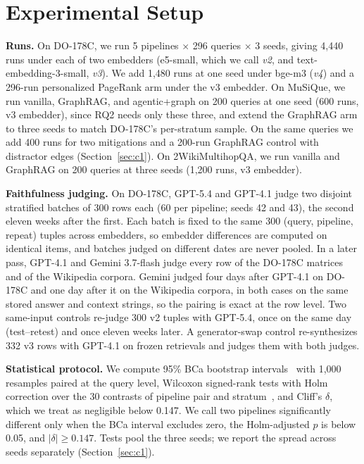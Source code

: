 \section{Experimental Setup}
\label{sec:experiments}

\noindent\textbf{Runs.} On DO-178C, we run 5 pipelines $\times$ 296 queries
$\times$ 3 seeds, giving 4{,}440 runs under each of two embedders
(e5-small, which we call \emph{v2}, and text-embedding-3-small,
\emph{v3}). We add 1{,}480 runs at one seed under bge-m3 (\emph{v4})
and a 296-run personalized PageRank arm under the v3 embedder. On
MuSiQue, we run vanilla, GraphRAG, and agentic+graph on 200 queries at
one seed (600 runs, v3 embedder), since RQ2 needs only these three, and
extend the GraphRAG arm to three seeds to match DO-178C's per-stratum
sample. On the same queries we add 400 runs for two mitigations and a
200-run GraphRAG control with distractor edges (Section~\ref{sec:c1}).
On 2WikiMultihopQA, we run vanilla and GraphRAG on 200 queries at three
seeds (1{,}200 runs, v3 embedder).

\noindent\textbf{Faithfulness judging.} On DO-178C, GPT-5.4 and GPT-4.1 judge
two disjoint stratified batches of 300 rows each (60 per pipeline;
seeds 42 and 43), the second eleven weeks after the first. Each batch is
fixed to the same 300 (query, pipeline, repeat) tuples across
embedders, so embedder differences are computed on identical items, and
batches judged on different dates are never pooled. In a later pass, GPT-4.1
and Gemini 3.7-flash judge every row of the DO-178C matrices and of the
Wikipedia corpora. Gemini judged four days after GPT-4.1 on DO-178C and
one day after it on the Wikipedia corpora, in both cases on the same
stored answer and context strings, so the pairing is exact at the row
level. Two same-input
controls re-judge 300 v2 tuples with GPT-5.4, once on the same day
(test--retest) and once eleven weeks later. A generator-swap control
re-synthesizes 332 v3 rows with GPT-4.1 on frozen retrievals and judges
them with both judges.

\noindent\textbf{Statistical protocol.} We compute 95\% BCa bootstrap
intervals~\cite{du2025bootstrap} with 1{,}000 resamples paired at the
query level, Wilcoxon signed-rank tests with Holm correction over the
30 contrasts of pipeline pair and stratum~\cite{bergkirkpatrick2012,koehn2004},
and Cliff's $\delta$, which we treat as negligible below 0.147. We call
two pipelines significantly different only when the BCa interval
excludes zero, the Holm-adjusted $p$ is below 0.05, and
$|\delta| \ge 0.147$. Tests pool the three seeds; we report the spread across seeds
separately (Section~\ref{sec:c1}).


